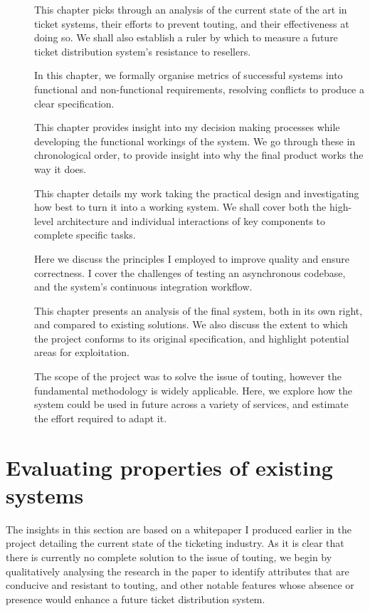 \documentclass[12pt,a4paper]{bhamdissertation}
\begin{document}
\begin{description}
    \item[] This chapter picks through an analysis of the current state of the art in ticket systems, their efforts to prevent touting, and their effectiveness at doing so. We shall also establish a ruler by which to measure a future ticket distribution system's resistance to resellers.
    \item[] In this chapter, we formally organise metrics of successful systems into functional and non-functional requirements, resolving conflicts to produce a clear specification.
    \item[] This chapter provides insight into my decision making processes while developing the functional workings of the system. We go through these in chronological order, to provide insight into why the final product works the way it does.
    \item[] This chapter details my work taking the practical design and investigating how best to turn it into a working system. We shall cover both the high-level architecture and individual interactions of key components to complete specific tasks.
    \item[] Here we discuss the principles I employed to improve quality and ensure correctness. I cover the challenges of testing an asynchronous codebase, and the system's continuous integration workflow.
    \item[] This chapter presents an analysis of the final system, both in its own right, and compared to existing solutions. We also discuss the extent to which the project conforms to its original specification, and highlight potential areas for exploitation.
    \item[] The scope of the project was to solve the issue of touting, however the fundamental methodology is widely applicable. Here, we explore how the system could be used in future across a variety of services, and estimate the effort required to adapt it.
\end{description}


\chapter{Evaluating properties of existing systems} \label{evaluating}

The insights in this section are based on a whitepaper \cite{B17} I produced earlier in the project detailing the current state of the ticketing industry. As it is clear that there is currently no complete solution to the issue of touting, we begin by qualitatively analysing the research in the paper to identify attributes that are conducive and resistant to touting, and other notable features whose absence or presence would enhance a future ticket distribution system.
\end{document}
